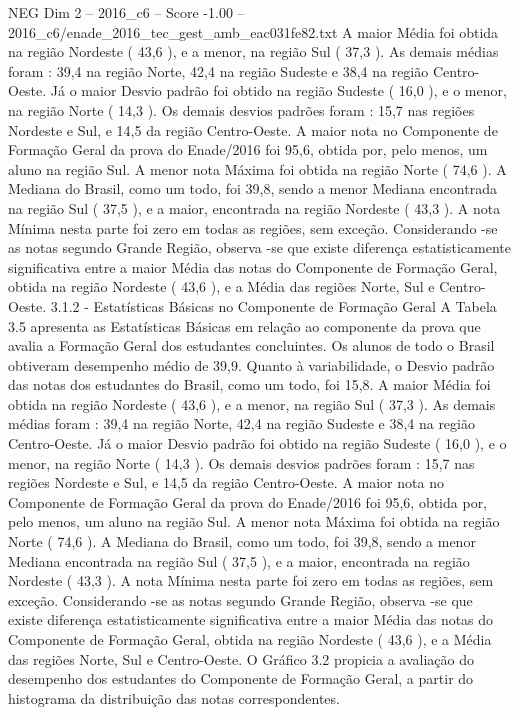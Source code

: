 \begin{textsample}{NEG Dim 2 – 2016\_c6 – Score -1.00 – 2016\_c6/enade\_2016\_tec\_gest\_amb\_eac031fe82.txt}
A maior Média foi obtida na região Nordeste ( 43,6 ), e a menor, na região Sul ( 37,3 ).
As demais médias foram : 39,4 na região Norte, 42,4 na região Sudeste e 38,4 na região Centro-Oeste.
Já o maior Desvio padrão foi obtido na região Sudeste ( 16,0 ), e o menor, na região Norte ( 14,3 ).
Os demais desvios padrões foram : 15,7 nas regiões Nordeste e Sul, e 14,5 da região Centro-Oeste.
A maior nota no Componente de Formação Geral da prova do Enade/2016 foi 95,6, obtida por, pelo menos, um aluno na região Sul.
A menor nota Máxima foi obtida na região Norte ( 74,6 ).
A Mediana do Brasil, como um todo, foi 39,8, sendo a menor Mediana encontrada na região Sul ( 37,5 ), e a maior, encontrada na região Nordeste ( 43,3 ).
A nota Mínima nesta parte foi zero em todas as regiões, sem exceção.
Considerando -se as notas segundo Grande Região, observa -se que existe diferença estatisticamente significativa entre a maior Média das notas do Componente de Formação Geral, obtida na região Nordeste ( 43,6 ), e a Média das regiões Norte, Sul e Centro-Oeste. 3.1.2 - Estatísticas Básicas no Componente de Formação Geral A Tabela 3.5 apresenta as Estatísticas Básicas em relação ao componente da prova que avalia a Formação Geral dos estudantes concluintes.
Os alunos de todo o Brasil obtiveram desempenho médio de 39,9.
Quanto à variabilidade, o Desvio padrão das notas dos estudantes do Brasil, como um todo, foi 15,8.
A maior Média foi obtida na região Nordeste ( 43,6 ), e a menor, na região Sul ( 37,3 ).
As demais médias foram : 39,4 na região Norte, 42,4 na região Sudeste e 38,4 na região Centro-Oeste.
Já o maior Desvio padrão foi obtido na região Sudeste ( 16,0 ), e o menor, na região Norte ( 14,3 ).
Os demais desvios padrões foram : 15,7 nas regiões Nordeste e Sul, e 14,5 da região Centro-Oeste.
A maior nota no Componente de Formação Geral da prova do Enade/2016 foi 95,6, obtida por, pelo menos, um aluno na região Sul.
A menor nota Máxima foi obtida na região Norte ( 74,6 ).
A Mediana do Brasil, como um todo, foi 39,8, sendo a menor Mediana encontrada na região Sul ( 37,5 ), e a maior, encontrada na região Nordeste ( 43,3 ).
A nota Mínima nesta parte foi zero em todas as regiões, sem exceção.
Considerando -se as notas segundo Grande Região, observa -se que existe diferença estatisticamente significativa entre a maior Média das notas do Componente de Formação Geral, obtida na região Nordeste ( 43,6 ), e a Média das regiões Norte, Sul e Centro-Oeste.
O Gráfico 3.2 propicia a avaliação do desempenho dos estudantes do Componente de Formação Geral, a partir do histograma da distribuição das notas correspondentes.

\end{textsample}
